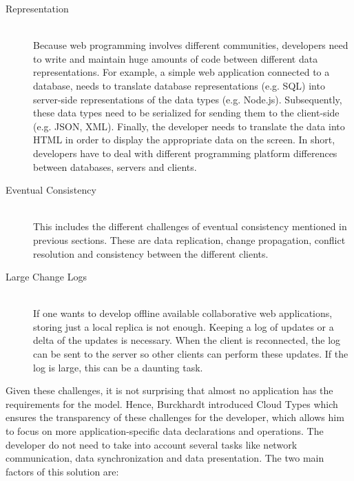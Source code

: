 \documentclass[a4paper,12pt]{report}
\begin{document}
\begin{description}
    \item[Representation] \hfill \\Because web programming involves different communities, developers need to write and maintain huge amounts of code between different data representations. For example, a simple web application connected to a database, needs to translate database representations (e.g. SQL) into server-side representations of the data types (e.g. Node.js). Subsequently, these data types need to be serialized for sending them to the client-side (e.g. JSON, XML). Finally, the developer needs to translate the data into HTML in order to display the appropriate data on the screen. In short, developers have to deal with different programming platform differences between databases, servers and clients. 
    \item[Eventual Consistency] \hfill \\This includes the different challenges of eventual consistency mentioned in previous sections. These are data replication, change propagation, conflict resolution and consistency between the different clients.
    \item[Large Change Logs] \hfill \\If one wants to develop offline available collaborative web applications, storing just a local replica is not enough. Keeping a log of updates or a delta of the updates is necessary. When the client is reconnected, the log can be sent to the server so other clients can perform these updates. If the log is large, this can be a daunting task.
\end{description}

Given these challenges, it is not surprising that almost no application has the requirements for the model. Hence, Burckhardt introduced Cloud Types which ensures the transparency of these challenges for the developer, which allows him to focus on more application-specific data declarations and operations. The developer do not need to take into account several tasks like network communication, data synchronization and data presentation. The two main factors of this solution are:
\end{document}

